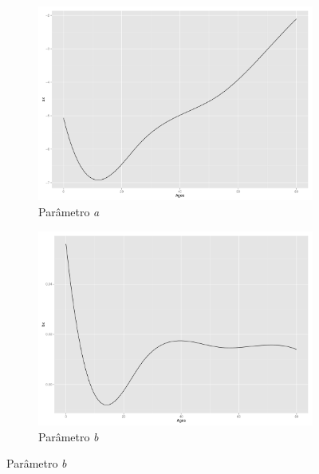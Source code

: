\documentclass[12pt, 						%
			openright, 					%
			twoside,					%
			a4paper,x					%
			english,					%
			brazil]{abntex2}				%
\begin{document}
 	\begin{figure}[!htb]
	\caption{\label{fig2} Parâmetros \textit{a} e \textit{b} do modelo Lee--Carter}
		\begin{subfigure}[b]{0.5\textwidth}
		\begin{center}
			\caption{\label{fig2.1} Parâmetro \textit{a}}
			\includegraphics[width=\textwidth]{Graphs/DR_LC_ax.pdf}
		\end{center}
		\end{subfigure}
	\hfill
		\begin{subfigure}[b]{0.5\textwidth}
		\begin{center}
			\caption{\label{fig2.2} Parâmetro \textit{b}}
			\includegraphics[width=\textwidth]{Graphs/DR_LC_bx.pdf}
		\end{center}
 		\end{subfigure}
	\end{figure} \\
\end{document}
